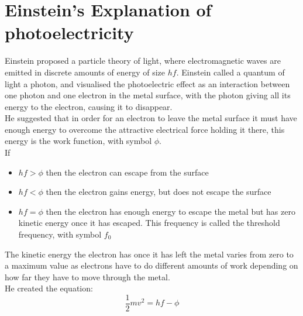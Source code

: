 \documentclass[12pt]{article}
\begin{document}
\section{Einstein's Explanation of photoelectricity}
Einstein proposed a particle theory of light, where electromagnetic waves are emitted in discrete amounts of energy of size $hf$. Einstein called a quantum of light a photon, and visualised the photoelectric effect as an interaction between one photon and one electron in the metal surface, with the photon giving all its energy to the electron, causing it to disappear.\\
He suggested that in order for an electron to leave the metal surface it must have enough energy to overcome the attractive electrical force holding it there, this energy is the work function, with symbol $\phi$. \\
If 
\begin{itemize}
\item $hf>\phi$ then the electron can escape from the surface
\item $hf<\phi$ then the electron gains energy, but does not escape the surface
\item $hf=\phi$ then the electron has enough energy to escape the metal but has zero kinetic energy once it has escaped. This frequency is called the threshold frequency, with symbol $f_0$
\end{itemize}
The kinetic energy the electron has once it has left the metal varies from zero to a maximum value as electrons have to do different amounts of work depending on how far they have to move through the metal.\\
He created the equation:
$$\frac{1}{2}mv^2=hf-\phi$$
\end{document}
